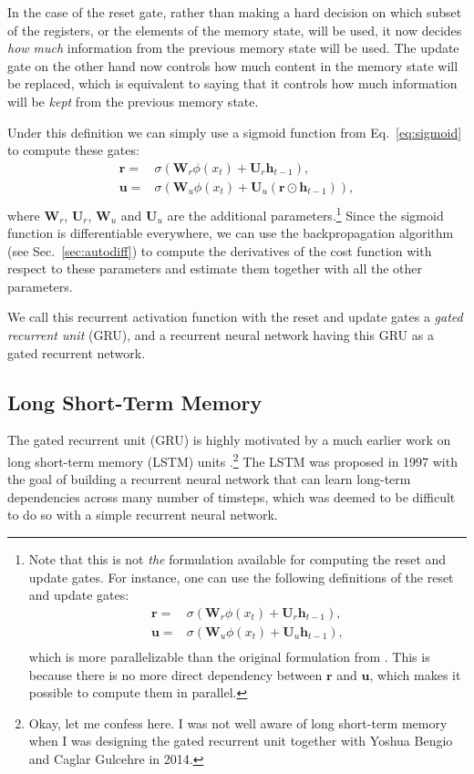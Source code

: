 \documentclass{report}
\newcommand{\vect}[1]{\mathbf{#1}}
\newcommand{\matr}[1]{\mathbf{#1}}
\newcommand{\vh}[0]{\vect{h}}
\newcommand{\vu}[0]{\vect{u}}
\newcommand{\vr}[0]{\vect{r}}
\newcommand{\mW}[0]{\matr{W}}
\newcommand{\mU}[0]{\matr{U}}
\newcommand{\sigmoid}{\sigma}
\begin{document}
In the case of the reset gate, rather than making a hard decision on which
subset of the registers, or the elements of the memory state, will be used, it
now decides {\em how much} information from the previous memory state will be
used. The update gate on the other hand now controls how much content in the
memory state will be replaced, which is equivalent to saying that it controls
how much information will be {\em kept} from the previous memory state.

Under this definition we can simply use a sigmoid function from
Eq.~\eqref{eq:sigmoid} to compute these gates:
\begin{align*}
    \vr =& \sigmoid(\mW_r \phi(x_t) + \mU_r \vh_{t-1}), \\
    \vu =& \sigmoid(\mW_u \phi(x_t) + \mU_u (\vr \odot \vh_{t-1})), \\
\end{align*}
where $\mW_r$, $\mU_r$, $\mW_u$ and $\mU_u$ are the additional
parameters.\footnote{
    Note that this is not {\em the} formulation available for computing the
    reset and update gates. For instance, one can use the following definitions
    of the reset and update gates:
    \begin{align*}
        \vr =& \sigmoid(\mW_r \phi(x_t) + \mU_r \vh_{t-1}), \\
        \vu =& \sigmoid(\mW_u \phi(x_t) + \mU_u \vh_{t-1}), \\
    \end{align*}
    which is more parallelizable than the original formulation from
    \citet{Cho-et-al-EMNLP2014}. This is because there is no more direct
    dependency between $\vr$ and $\vu$, which makes it possible to compute them
    in parallel.
}
Since
the sigmoid function is differentiable everywhere, we can use the
backpropagation algorithm (see Sec.~\ref{sec:autodiff}) to compute the
derivatives of the cost function with respect to these parameters and estimate
them together with all the other parameters.

We call this recurrent activation function with the reset and update gates a
{\em gated recurrent unit} (GRU), and a recurrent neural network having this GRU
as a gated recurrent network.

\subsection{Long Short-Term Memory}
\label{sec:lstm}

The gated recurrent unit (GRU) is highly motivated by a much earlier work on
long short-term memory (LSTM) units \citep{hochreiter1997long}.\footnote{
    Okay, let me confess here. I was not well aware of long short-term memory
    when I was designing the gated recurrent unit together with Yoshua Bengio
    and Caglar Gulcehre in 2014.
} The LSTM was proposed in 1997 with the goal of building a recurrent neural
network that can learn long-term dependencies across many number of timsteps,
which was deemed to be difficult to do so with a simple recurrent neural
network. 
\end{document}
